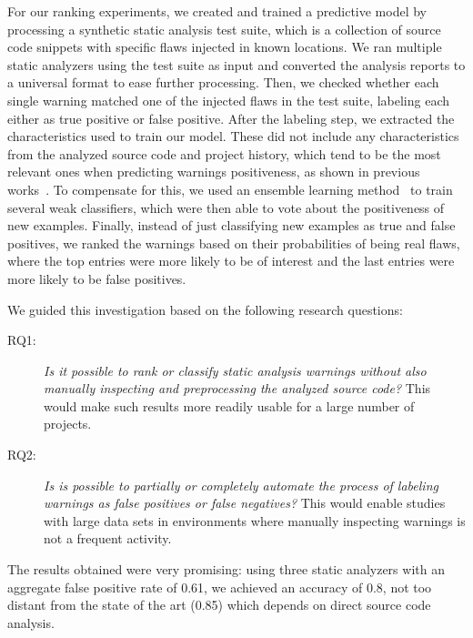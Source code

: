 
For our ranking experiments, we created and trained a
predictive model by processing a synthetic static analysis test
suite, which is a collection of source code snippets with specific flaws
injected in known locations. We ran multiple static analyzers using the test
suite as input and converted the analysis reports to a universal format to
ease further processing.
Then, we checked whether each single warning matched one of the injected flaws in
the test suite, labeling each either as true positive or
false positive. After the labeling step, we extracted the
characteristics used to train our model. These did not include
any characteristics from the analyzed source code and project history, which
tend to be the most relevant ones when predicting warnings positiveness, as
shown in previous works~\cite{yoon2014reducing, jung2005taming}. To compensate
for this, we used an ensemble learning method~\cite{aima} to train several
weak classifiers, which were then able to vote about the positiveness of new examples.
Finally, instead of just classifying new examples as true and false positives,
we ranked the warnings based on their probabilities of being real flaws, where
the top entries were more likely to be of interest and the last entries were more
likely to be false positives.

We guided this investigation based on the following research questions:

\begin{description}
  \item [RQ1:] \textit{Is it possible to rank or classify static analysis warnings without also
  manually inspecting and preprocessing the analyzed source code?} This would make
  such results more readily usable for a large number of projects.

  \item [RQ2:] \textit{Is is possible to partially or completely automate the process of
    labeling warnings as false positives or false negatives?} This would enable
    studies with large data sets in environments where manually inspecting
    warnings is not a frequent activity.
\end{description}

The results obtained were very promising: using three static analyzers with an
aggregate false positive rate of 0.61, we achieved an accuracy of 0.8, not too
distant from the state of the art (0.85) which depends on direct source code
analysis.

